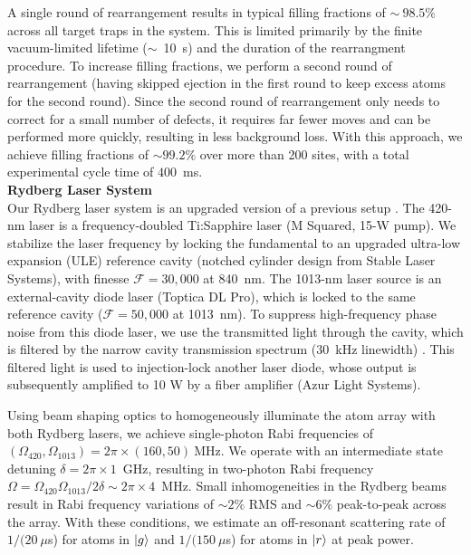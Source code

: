 \documentclass[reprint,twocolumn,secnumarabic,amssymb, aps, prl]{revtex4-1}
\begin{document}
A single round of rearrangement results in typical filling fractions of $\sim~98.5\%$ across all target traps in the system. This is limited primarily by the finite vacuum-limited lifetime ($\sim$~10~s) and the duration of the rearrangment procedure. To increase filling fractions, we perform a second round of rearrangement (having skipped ejection in the first round to keep excess atoms for the second round). Since the second round of rearrangement only needs to correct for a small number of defects, it requires far fewer moves and can be performed more quickly, resulting in less background loss. With this approach, we achieve filling fractions of $\sim 99.2\%$ over more than 200 sites, with a total experimental cycle time of $400$~ms.\\

\noindent\textbf{Rydberg Laser System}\\
Our Rydberg laser system is an upgraded version of a previous setup \cite{AtomArrayCats2019}. The 420-nm laser is a frequency-doubled Ti:Sapphire laser (M Squared, 15-W pump). We stabilize the laser frequency by locking the fundamental to an upgraded ultra-low expansion (ULE) reference cavity (notched cylinder design from Stable Laser Systems), with finesse $\mathcal{F}=30,000$ at 840~nm. The 1013-nm laser source is an external-cavity diode laser (Toptica DL Pro), which is locked to the same reference cavity ($\mathcal{F} = 50,000$ at 1013~nm). To suppress high-frequency phase noise from this diode laser, we use the transmitted light through the cavity, which is filtered by the narrow cavity transmission spectrum ($30$~kHz linewidth) \cite{AtomArrayPRL2018}. This filtered light is used to injection-lock another laser diode, whose output is subsequently amplified to 10 W by a fiber amplifier (Azur Light Systems).

Using beam shaping optics to homogeneously illuminate the atom array with both Rydberg lasers, we achieve single-photon Rabi frequencies of $(\Omega_\text{420}, \Omega_\text{1013}) = 2\pi \times (160, 50)~$MHz. We operate with an intermediate state detuning $\delta = 2\pi \times 1$~GHz, resulting in two-photon Rabi frequency $\Omega = \Omega_\text{420} \Omega_\text{1013} / 2\delta \sim 2\pi \times 4$~MHz. Small inhomogeneities in the Rydberg beams result in Rabi frequency variations of $\sim 2\%$ RMS and $\sim 6\%$ peak-to-peak across the array.
With these conditions, we estimate an off-resonant scattering rate of $1/(20~\mu$s) for atoms in $\ket{g}$ and $1/(150~\mu$s) for atoms in $\ket{r}$ at peak power.\\
\end{document}
